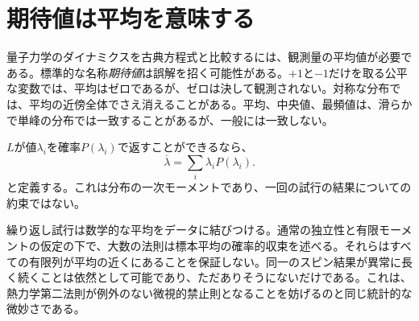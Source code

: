 \begin{classroomqa}
\end{classroomqa}

\section{期待値は平均を意味する}

量子力学のダイナミクスを古典方程式と比較するには、観測量の平均値が必要である。標準的な名称\emph{期待値}は誤解を招く可能性がある。\(+1\)と\(-1\)だけを取る公平な変数では、平均はゼロであるが、ゼロは決して観測されない。対称な分布では、平均の近傍全体でさえ消えることがある。平均、中央値、最頻値は、滑らかで単峰の分布では一致することがあるが、一般には一致しない。

\(L\)が値\(\lambda_i\)を確率\(P(\lambda_i)\)で返すことができるなら、
\begin{equation}
\overline{\lambda}=\sum_i\lambda_iP(\lambda_i).
\label{eq:l4-probability-average}
\end{equation}
と定義する。これは分布の一次モーメントであり、一回の試行の結果についての約束ではない。

\begin{classroomqa}
\end{classroomqa}

繰り返し試行は数学的な平均をデータに結びつける。通常の独立性と有限モーメントの仮定の下で、大数の法則は標本平均の確率的収束を述べる。それらはすべての有限列が平均の近くにあることを保証しない。同一のスピン結果が異常に長く続くことは依然として可能であり、ただありそうにないだけである。これは、熱力学第二法則が例外のない微視的禁止則となることを妨げるのと同じ統計的な微妙さである。

\begin{classroomqa}
\end{classroomqa}

